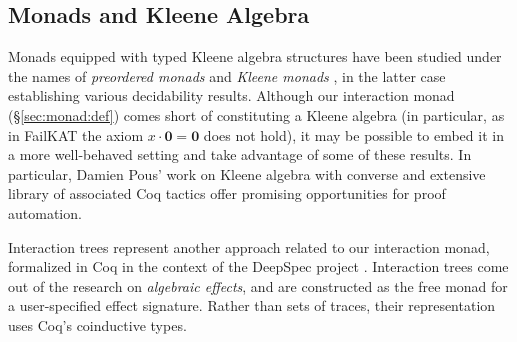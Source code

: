 \documentclass[acmsmall,timestamp,review,anonymous]{acmart}
\begin{document}

\subsection{Monads and Kleene Algebra} %

Monads equipped with
typed Kleene algebra structures
have been studied under the names of
\emph{preordered monads} \cite{pom} and
\emph{Kleene monads} \cite{kleenem},
in the latter case establishing various decidability results.
Although our interaction monad (\S\ref{sec:monad:def})
comes short of constituting a Kleene algebra
(in particular, as in FailKAT \cite{failkat}
the axiom $x \cdot \mathbf{0} = \mathbf{0}$ does not hold),
it may be possible to embed it in a more well-behaved setting
and take advantage of some of these results.
In particular,
Damien Pous' work on Kleene algebra with converse
and extensive library of associated Coq tactics
offer promising opportunities for proof automation.

Interaction trees \cite{itrees}
represent another approach
related to our interaction monad,
formalized in Coq in the context of the DeepSpec project \cite{deepspec}.
Interaction trees
come out of the research on \emph{algebraic effects},
and are constructed as the free monad
for a user-specified effect signature.
Rather than sets of traces,
their representation uses Coq's coinductive types.


%




\end{document}
